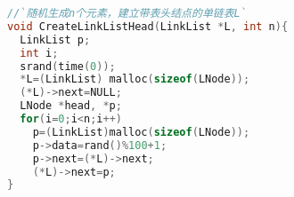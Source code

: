 \begin{lstlisting}[language=C,frame=tb,backgroundcolor=\color{red!10}]
//`随机生成n个元素，建立带表头结点的单链表L`
void CreateLinkListHead(LinkList *L, int n){
  LinkList p;
  int i;
  srand(time(0));
  *L=(LinkList) malloc(sizeof(LNode));
  (*L)->next=NULL;
  LNode *head, *p;
  for(i=0;i<n;i++)
    p=(LinkList)malloc(sizeof(LNode));
    p->data=rand()%100+1;
    p->next=(*L)->next;
    (*L)->next=p;
}
\end{lstlisting}
